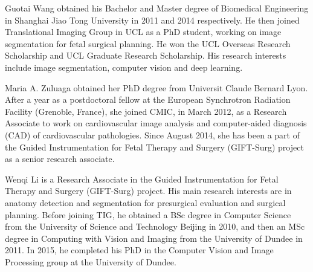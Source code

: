 \documentclass[10pt,journal,compsoc]{IEEEtran}
\begin{document}
\ifCLASSOPTIONcaptionsoff
  \newpage
\fi




















\begin{IEEEbiography}{Guotai Wang}
obtained his Bachelor and Master degree of Biomedical Engineering in Shanghai Jiao Tong University in 2011 and 2014 respectively. %
He then joined Translational Imaging Group in UCL as a PhD student, working on image segmentation for fetal surgical planning. He won the UCL Overseas Research Scholarship and UCL Graduate Research Scholarship. His research interests include image segmentation, computer vision and deep learning.


\end{IEEEbiography}
\begin{IEEEbiography}{Maria A. Zuluaga}
obtained her PhD degree from Universit Claude Bernard Lyon. %
After a year as a postdoctoral fellow at the European Synchrotron Radiation Facility (Grenoble, France), she joined CMIC, in March 2012, as a Research Associate to work on cardiovascular image analysis and computer-aided diagnosis (CAD) of cardiovascular pathologies. Since August 2014, she has been a part of the Guided Instrumentation for Fetal Therapy and Surgery (GIFT-Surg) project as a senior research associate.
\end{IEEEbiography}
\begin{IEEEbiography}{Wenqi Li} is a Research Associate in the Guided Instrumentation for Fetal Therapy and Surgery (GIFT-Surg) project. His main research interests are in anatomy detection and segmentation for presurgical evaluation and surgical planning. Before joining TIG, he obtained a BSc degree in Computer Science from the University of Science and Technology Beijing in 2010, and then an MSc degree in Computing with Vision and Imaging from the University of Dundee in 2011. In 2015, he completed his PhD in the Computer Vision and Image Processing group at the University of Dundee.
\end{IEEEbiography}
\end{document}
